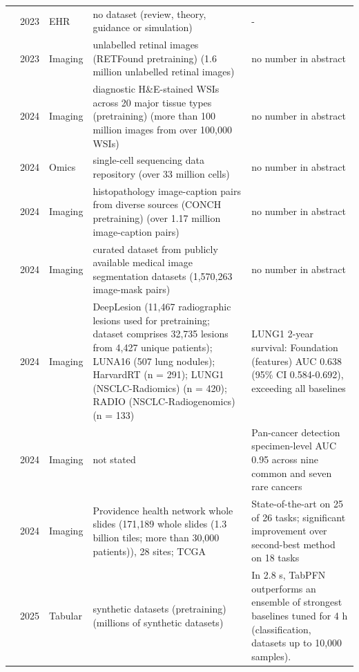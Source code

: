 \begin{longtable}{@{}p{2.6cm}p{0.7cm}p{1.2cm}p{4.4cm}p{4.6cm}@{}}
\cite{wornow2023shaky} & 2023 & EHR & no dataset (review, theory, guidance or simulation) & -\\
\cite{zhou2023foundation} & 2023 & Imaging & unlabelled retinal images (RETFound pretraining) (1.6 million unlabelled retinal images) & no number in abstract\\
\cite{chen2024general} & 2024 & Imaging & diagnostic H\&E-stained WSIs across 20 major tissue types (pretraining) (more than 100 million images from over 100,000 WSIs) & no number in abstract\\
\cite{cui2024scgpt} & 2024 & Omics & single-cell sequencing data repository (over 33 million cells) & no number in abstract\\
\cite{lu2024visual} & 2024 & Imaging & histopathology image-caption pairs from diverse sources (CONCH pretraining) (over 1.17 million image-caption pairs) & no number in abstract\\
\cite{ma2024segment} & 2024 & Imaging & curated dataset from publicly available medical image segmentation datasets (1,570,263 image-mask pairs) & no number in abstract\\
\cite{pai2024foundation} & 2024 & Imaging & DeepLesion (11,467 radiographic lesions used for pretraining; dataset comprises 32,735 lesions from 4,427 unique patients); LUNA16 (507 lung nodules); HarvardRT (n = 291); LUNG1 (NSCLC-Radiomics) (n = 420); RADIO (NSCLC-Radiogenomics) (n = 133) & LUNG1 2-year survival: Foundation (features) AUC 0.638 (95\% CI 0.584-0.692), exceeding all baselines\\
\cite{vorontsov2024foundation} & 2024 & Imaging & not stated & Pan-cancer detection specimen-level AUC 0.95 across nine common and seven rare cancers\\
\cite{xu2024whole} & 2024 & Imaging & Providence health network whole slides (171,189 whole slides (1.3 billion tiles; more than 30,000 patients)), 28 sites; TCGA & State-of-the-art on 25 of 26 tasks; significant improvement over second-best method on 18 tasks\\
\cite{hollmann2025accurate} & 2025 & Tabular & synthetic datasets (pretraining) (millions of synthetic datasets) & In 2.8 s, TabPFN outperforms an ensemble of strongest baselines tuned for 4 h (classification, datasets up to 10,000 samples).\\
\bottomrule
\end{longtable}

